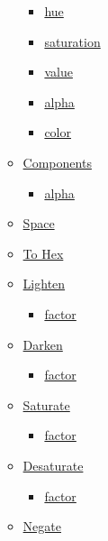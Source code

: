 \begin{itemize}
\begin{itemize}
    \begin{itemize}
    \tightlist
    \item
      \hyperref[definitions-hsv-hue]{hue}
    \item
      \hyperref[definitions-hsv-saturation]{saturation}
    \item
      \hyperref[definitions-hsv-value]{value}
    \item
      \hyperref[definitions-hsv-alpha]{alpha}
    \item
      \hyperref[definitions-hsv-color]{color}
    \end{itemize}
  \item
    \hyperref[definitions-components]{Components}

    \begin{itemize}
    \tightlist
    \item
      \hyperref[definitions-components-alpha]{alpha}
    \end{itemize}
  \item
    \hyperref[definitions-space]{Space}
  \item
    \hyperref[definitions-to-hex]{To Hex}
  \item
    \hyperref[definitions-lighten]{Lighten}

    \begin{itemize}
    \tightlist
    \item
      \hyperref[definitions-lighten-factor]{factor}
    \end{itemize}
  \item
    \hyperref[definitions-darken]{Darken}

    \begin{itemize}
    \tightlist
    \item
      \hyperref[definitions-darken-factor]{factor}
    \end{itemize}
  \item
    \hyperref[definitions-saturate]{Saturate}

    \begin{itemize}
    \tightlist
    \item
      \hyperref[definitions-saturate-factor]{factor}
    \end{itemize}
  \item
    \hyperref[definitions-desaturate]{Desaturate}

    \begin{itemize}
    \tightlist
    \item
      \hyperref[definitions-desaturate-factor]{factor}
    \end{itemize}
  \item
    \hyperref[definitions-negate]{Negate}


\end{itemize}
\end{itemize}
